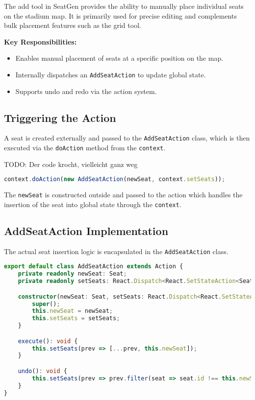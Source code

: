 The add tool in SeatGen provides the ability to manually place individual seats on the stadium map. It is primarily used for precise editing and complements bulk placement features such as the grid tool.

\textbf{Key Responsibilities:}
\begin{itemize}
    \item Enables manual placement of seats at a specific position on the map.
    \item Internally dispatches an \texttt{AddSeatAction} to update global state.
    \item Supports undo and redo via the action system.
\end{itemize}

\subsection{Triggering the Action}

A seat is created externally and passed to the \texttt{AddSeatAction} class, which is then executed via the \texttt{doAction} method from the \texttt{context}.

TODO: Der code krocht, vielleicht ganz weg

\begin{lstlisting}[language=TypeScript, caption=Calling AddSeatAction, label=lst:add-tool-action-call]
context.doAction(new AddSeatAction(newSeat, context.setSeats));
\end{lstlisting}

The \texttt{newSeat} is constructed outside and passed to the action which handles the insertion of the seat into global state through the \texttt{context}.

\subsection{AddSeatAction Implementation}

The actual seat insertion logic is encapsulated in the \texttt{AddSeatAction} class.

\begin{lstlisting}[language=TypeScript, caption=AddSeatAction Implementation, label=lst:add-seat-action]
export default class AddSeatAction extends Action {
    private readonly newSeat: Seat;
    private readonly setSeats: React.Dispatch<React.SetStateAction<Seat[]>>;

    constructor(newSeat: Seat, setSeats: React.Dispatch<React.SetStateAction<Seat[]>>) {
        super();
        this.newSeat = newSeat;
        this.setSeats = setSeats;
    }

    execute(): void {
        this.setSeats(prev => [...prev, this.newSeat]);
    }

    undo(): void {
        this.setSeats(prev => prev.filter(seat => seat.id !== this.newSeat.id));
    }
}
\end{lstlisting}

